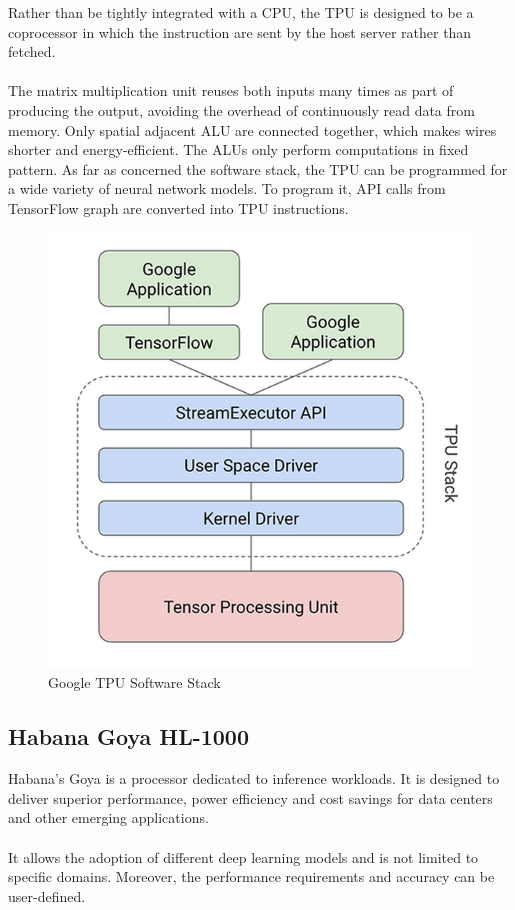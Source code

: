 Rather than be tightly integrated with a CPU, the TPU is designed to be a coprocessor in which the instruction are sent by the host server rather than fetched.\\\\
The matrix multiplication unit reuses both inputs many times as part of producing the output, avoiding the overhead of continuously read data from memory. Only spatial adjacent ALU are connected together, which makes wires shorter and energy-efficient. The ALUs only perform computations in fixed pattern.
\newpage
As far as concerned the software stack, the TPU can be programmed for a wide variety of neural network models. To program it, API calls from TensorFlow graph are converted into TPU instructions.
\begin{figure}[H]
\centering
\captionsetup{justification=centering}
\includegraphics[scale=0.4]{./figure/tpu_sw_stack.PNG}
\caption{Google TPU Software Stack \cite{WEBSITE:9}}
\label{fig:gtpuswstack}
\end{figure}

\subsection{Habana Goya HL-1000}

Habana’s Goya is a processor dedicated to inference workloads. It is designed to deliver superior performance, power efficiency and cost savings for data centers and other emerging applications.\\\\
It allows the adoption of different deep learning models and is not limited to specific domains. Moreover, the performance requirements and accuracy can be user-defined.\\\\

